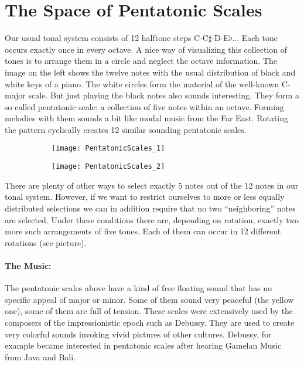 \section{The Space of Pentatonic Scales}
Our usual tonal system consists of 12 halftone steps C-C$\sharp$-D-E$\flat$... Each tone occurs exactly once in every octave. A nice way of visualizing this collection of tones is to arrange them in a circle and neglect the octave information. The image on the left shows the twelve notes with the usual distribution of black and white keys of a piano. The white circles form the material of the well-known C-major scale. But just playing the black notes also sounds interesting. They form a so called pentatonic scale: a collection of five notes within an octave. Forming melodies with them sounds a bit like modal music from the Far East. Rotating the pattern cyclically creates 12 similar sounding pentatonic scales.

\begin{figure}[h]
\centering
\begin{subfigure}{0.45\textwidth}
\centering
\texttt{[image: PentatonicScales\_1]}
\end{subfigure}
\begin{subfigure}{0.45\textwidth}
\centering
\texttt{[image: PentatonicScales\_2]}
\end{subfigure}
\end{figure}

There are plenty of other ways to select exactly 5 notes out of the 12 notes in our tonal system. However, if we want to restrict ourselves to more or less equally distributed selections we can in addition require that no two ``neighboring'' notes are selected. Under these conditions there are, depending on rotation, exactly two more such arrangements of five tones. Each of them can occur in 12 different rotations (see picture).

\paragraph{The Music:} The pentatonic scales above have a kind of free floating sound that has no specific appeal of major or minor. Some of them sound very peaceful (the yellow one), some of them are full of tension. These scales were extensively used by the composers of the impressionistic epoch such as Debussy. They are used to create very colorful sounds invoking vivid pictures of other cultures. Debussy, for example became interested in pentatonic scales after hearing Gamelan Music from Java and Bali.

